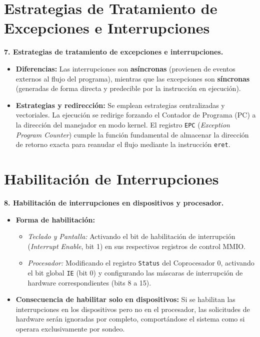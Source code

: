 \documentclass[12pt,a4paper]{article}
\begin{document}
\section{Estrategias de Tratamiento de Excepciones e Interrupciones} 
\textbf{7. Estrategias de tratamiento de excepciones e interrupciones.} 

\begin{itemize}
    \item[a)] \textbf{Diferencias:} Las interrupciones son \textbf{asíncronas} (provienen de eventos externos al flujo del programa), mientras que las excepciones son \textbf{síncronas} (generadas de forma directa y predecible por la instrucción en ejecución).
    
    \item[b)] \textbf{Estrategias y redirección:} Se emplean estrategias centralizadas y vectoriales. La ejecución se redirige forzando el Contador de Programa (PC) a la dirección del manejador en modo kernel. El registro \texttt{EPC} (\textit{Exception Program Counter}) cumple la función fundamental de almacenar la dirección de retorno exacta para reanudar el flujo mediante la instrucción \texttt{eret}. 
\end{itemize}


\section{Habilitación de Interrupciones} 
\textbf{8. Habilitación de interrupciones en dispositivos y procesador.} 

\begin{itemize}
    \item[a)] \textbf{Forma de habilitación:} 
    \begin{itemize}
        \item \textit{Teclado y Pantalla:} Activando el bit de habilitación de interrupción (\textit{Interrupt Enable}, bit 1) en sus respectivos registros de control MMIO. 
        \item \textit{Procesador:} Modificando el registro \texttt{Status} del Coprocesador 0, activando el bit global \texttt{IE} (bit 0) y configurando las máscaras de interrupción de hardware correspondientes (bits 8 a 15).
    \end{itemize}
    
    \item[b)] \textbf{Consecuencia de habilitar solo en dispositivos:} Si se habilitan las interrupciones en los dispositivos pero no en el procesador, las solicitudes de hardware serán ignoradas por completo, comportándose el sistema como si operara exclusivamente por sondeo. 
\end{itemize}
\end{document}
